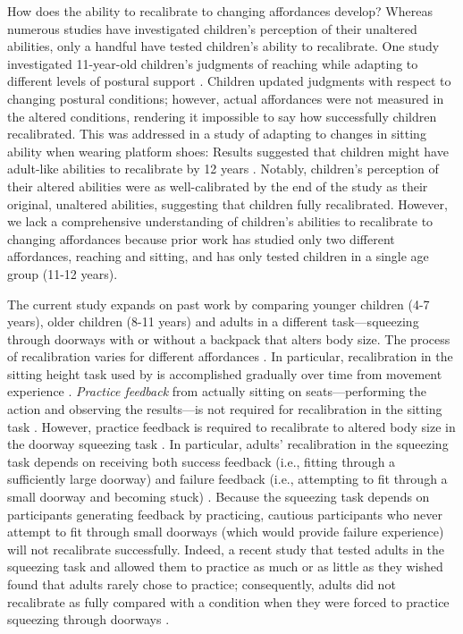 \documentclass[a4paper,man,natbib,floatsintext,noextraspace]{apa6}
\begin{document}
How does the ability to recalibrate to changing affordances develop? Whereas numerous studies have investigated children's perception of their unaltered abilities, only a handful have tested children's ability to recalibrate. One study investigated 11-year-old children’s judgments of reaching while adapting to different levels of postural support \citep{JohnsonWade2009}. Children updated judgments with respect to changing postural conditions; however, actual affordances were not measured in the altered conditions, rendering it impossible to say how successfully children recalibrated. This was addressed in a study of adapting to changes in sitting ability when wearing platform shoes: Results suggested that children might have adult-like abilities to recalibrate by 12 years \citep{ChenRecal}. Notably, children's perception of their altered abilities were as well-calibrated by the end of the study as their original, unaltered abilities, suggesting that children fully recalibrated. However, we lack a comprehensive understanding of children's abilities to recalibrate to changing affordances because prior work has studied only two different affordances, reaching and sitting, and has only tested children in a single age group (11-12 years). 

The current study expands on past work by comparing younger children (4-7 years), older children (8-11 years) and adults in a different task---squeezing through doorways with or without a backpack that alters body size. The process of recalibration varies for different affordances \citep{Recal}. In particular, recalibration in the sitting height task used by \cite{ChenRecal} is accomplished gradually over time from movement experience \cite{Mark87}. \textit{Practice feedback} from actually sitting on seats---performing the action and observing the results---is not required for recalibration in the sitting task \citep{MarkSitting90}. However, practice feedback is required to recalibrate to altered body size in the doorway squeezing task \citep{Recal,PregAps}. In particular, adults' recalibration in the squeezing task depends on receiving both success feedback (i.e., fitting through a sufficiently large doorway) and failure feedback (i.e., attempting to fit through a small doorway and becoming stuck) \citep{DoorwayLearning}. Because the squeezing task depends on participants generating feedback by practicing, cautious participants who never attempt to fit through small doorways (which would provide failure experience) will not recalibrate successfully. Indeed, a recent study that tested adults in the squeezing task and allowed them to practice as much or as little as they wished found that adults rarely chose to practice; consequently, adults did not recalibrate as fully compared with a condition when they were forced to practice squeezing through doorways \citep{DoorwayExplore}. 
\end{document}
